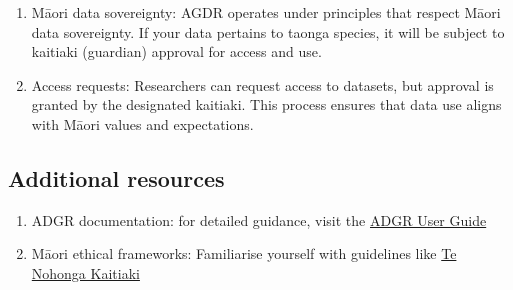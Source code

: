 \documentclass[
]{article}
\begin{document}
\begin{enumerate}
\def\labelenumi{\arabic{enumi}.}
\item
  Māori data sovereignty: AGDR operates under principles that respect
  Māori data sovereignty. If your data pertains to taonga species, it
  will be subject to kaitiaki (guardian) approval for access and use.
\item
  Access requests: Researchers can request access to datasets, but
  approval is granted by the designated kaitiaki. This process ensures
  that data use aligns with Māori values and expectations.
\end{enumerate}

\hypertarget{additional-resources}{%
\subsection{Additional resources}\label{additional-resources}}

\begin{enumerate}
\def\labelenumi{\arabic{enumi}.}
\item
  ADGR documentation: for detailed guidance, visit the
  \href{https://docs.agdr.org.nz/}{ADGR User Guide}
\item
  Māori ethical frameworks: Familiarise yourself with guidelines like
  \href{https://www.genomics-aotearoa.org.nz/our-work/completed-projects/te-nohonga-kaitiaki}{Te
  Nohonga Kaitiaki}
\end{enumerate}
\end{document}
